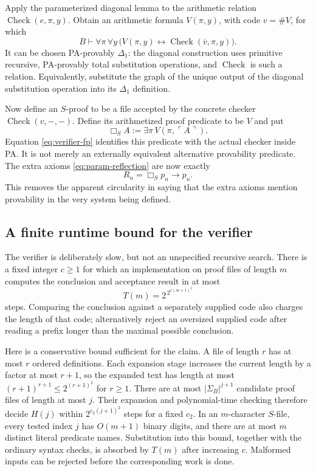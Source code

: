 \documentclass[11pt]{article}
\theoremstyle{remark}
\newcommand{\Chk}{\operatorname{Check}}
\newcommand{\num}[1]{\overline{#1}}
\newcommand{\gn}[1]{\ulcorner #1\urcorner}
\begin{document}
Apply the parameterized diagonal lemma to the arithmetic relation
$\Chk(e,\pi,y)$. Obtain an arithmetic formula $V(\pi,y)$, with code
$v=\#V$, for which
\begin{equation}\label{eq:verifier-fp}
 B\vdash\forall\pi\,\forall y\,
 \bigl(V(\pi,y)\leftrightarrow\Chk(\num v,\pi,y)\bigr).
\end{equation}
It can be chosen PA-provably $\Delta_1$: the diagonal construction uses
primitive recursive, PA-provably total substitution operations, and $\Chk$
is such a relation. Equivalently, substitute the graph of the unique output
of the diagonal substitution operation into its $\Delta_1$ definition.

Now define an $S$-proof to be a file accepted by the concrete checker
$\Chk(v,-,-)$. Define its arithmetized proof predicate to be $V$ and put
\[
 \Box_S A:=\exists\pi\,V(\pi,\gn A).
\]
Equation \eqref{eq:verifier-fp} identifies this predicate with the actual
checker inside PA. It is not merely an externally equivalent alternative
provability predicate. The extra axioms \eqref{eq:param-reflection} are now
exactly
\begin{equation}\label{eq:Ri}
 R_n=\Box_Sp_n\to p_n.
\end{equation}
This removes the apparent circularity in saying that the extra axioms
mention provability in the very system being defined.

\subsection{A finite runtime bound for the verifier}

The verifier is deliberately slow, but not an unspecified recursive search.
There is a fixed integer $c\ge1$ for which an implementation on proof files
of length $m$ computes the conclusion and acceptance result in at most
\[
 T(m)=2^{\,2^{c(m+1)^2}}
\]
steps. Comparing the conclusion against a separately supplied code also
charges the length of that code; alternatively reject an oversized supplied
code after reading a prefix longer than the maximal possible conclusion.

Here is a conservative bound sufficient for the claim. A file of length $r$
has at most $r$ ordered definitions. Each expansion stage increases the
current length by a factor at most $r+1$, so the expanded text has length at
most $(r+1)^{r+1}\le 2^{(r+1)^2}$ for $r\ge1$. There are at most
$|\Sigma_B|^{j+1}$ candidate proof files of length at most $j$. Their
expansion and polynomial-time checking therefore decide $H(j)$ within
$2^{c_2(j+1)^2}$ steps for a fixed $c_2$. In an $m$-character $S$-file,
every tested index $j$ has $O(m+1)$ binary digits, and there are at most $m$
distinct literal predicate names. Substitution into this bound, together with
the ordinary syntax checks, is absorbed by $T(m)$ after increasing $c$.
Malformed inputs can be rejected before the corresponding work is done.
\end{document}
